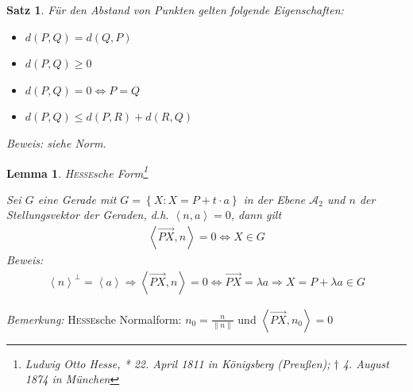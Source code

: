 \documentclass[%
a4paper,
10pt,           %
]
{scrartcl}
\newcommand{\ora}{\overrightarrow}
\theoremstyle{plain}
\theoremstyle{plain}
\newtheorem{mysatz}[mydef]{Satz}
\theoremstyle{plain}
\newtheorem{mylemma}[mydef]{Lemma}
\theoremstyle{plain}
\theoremstyle{plain}
\begin{document}
\begin{mysatz}
    Für den Abstand von Punkten gelten folgende Eigenschaften:
    \begin{itemize}
        \item[(i)] $d(P,Q) = d(Q,P)$
        \item[(ii)] $d(P,Q) \geq 0$
        \item[(iii)] $d(P,Q) = 0 \Leftrightarrow P = Q$
        \item[(iv)] $d(P,Q) \leq d(P,R) + d(R,Q)$
    \end{itemize}
    \textit{Beweis:} siehe Norm.
\end{mysatz}

\begin{mylemma}
    \textsc{Hesse}sche Form\footnote{Ludwig Otto Hesse, * 22. April 1811 in Königsberg (Preußen); $\dagger$ 4. August 1874 in München}

    Sei $G$ eine Gerade mit $G = \left\{ X : X = P+t \cdot a \right\}$ in der Ebene $\mathcal{A}_2$ und $n$ der Stellungsvektor der Geraden, d.h. $\left\langle n,a \right\rangle=0$, dann gilt
    \begin{align*}
        \left\langle \ora{PX} , n \right\rangle = 0 \Leftrightarrow X \in G
    \end{align*}
    \textit{Beweis:}
    \begin{align*}
        \left\langle n \right\rangle^{\bot} = \left\langle a \right\rangle \Rightarrow \left\langle \ora{PX} , n \right\rangle = 0 \Leftrightarrow \ora{PX} = \lambda a \Rightarrow X = P + \lambda a \in G
    \end{align*}
\end{mylemma}
\textit{Bemerkung:} \textsc{Hesse}sche Normalform: $n_0 = \frac{n}{\| n \|}$ und $\left\langle \ora{PX} , n_0 \right\rangle = 0$
\end{document}
